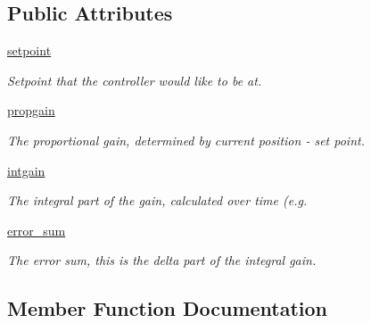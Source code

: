 \subsection*{Public Attributes}
\begin{DoxyCompactItemize}
\item 
\mbox{\label{classclosed__loop_1_1_closed___loop_a766d428f86901b3873e5bbd9ffee9311}} 
\mbox{\hyperlink{classclosed__loop_1_1_closed___loop_a766d428f86901b3873e5bbd9ffee9311}{setpoint}}
\begin{DoxyCompactList}\small\item\em Setpoint that the controller would like to be at. \end{DoxyCompactList}\item 
\mbox{\label{classclosed__loop_1_1_closed___loop_a0a08e1704606920a1723ee0120009fb6}} 
\mbox{\hyperlink{classclosed__loop_1_1_closed___loop_a0a08e1704606920a1723ee0120009fb6}{propgain}}
\begin{DoxyCompactList}\small\item\em The proportional gain, determined by current position -\/ set point. \end{DoxyCompactList}\item 
\mbox{\hyperlink{classclosed__loop_1_1_closed___loop_aca1d60310aeee998957c88ec32a8f660}{intgain}}
\begin{DoxyCompactList}\small\item\em The integral part of the gain, calculated over time (e.\+g. \end{DoxyCompactList}\item 
\mbox{\hyperlink{classclosed__loop_1_1_closed___loop_a009eae11cd48d7a96b2332367efd5df2}{error\+\_\+sum}}
\begin{DoxyCompactList}\small\item\em The error sum, this is the delta part of the integral gain. \end{DoxyCompactList}\end{DoxyCompactItemize}


\subsection{Member Function Documentation}
\mbox{\label{classclosed__loop_1_1_closed___loop_a3f3be180b49ecd228fc0a14bec29cb2a}} 
